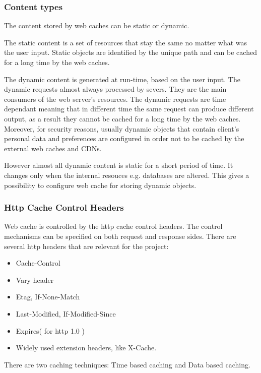 \subsubsection{Content types}


The content stored by web caches can be static or dynamic.

The static content is a set of resources that stay the same no matter what was the user input. Static objects are identified by the unique path and can be cached for a long time by the web caches.

The dynamic content is generated at run-time, based on the user input\cite{DynamicWebCaching}. The dynamic requests almost always processed by severs. They are the main consumers of the web server's resources. The dynamic requests are time dependant meaning that in different time the same request can produce different output, as a result they cannot be cached for a long time by the web caches. Moreover, for security reasons, usually dynamic objects that contain client's personal data and preferences are configured in order not to be cached by the external web caches and CDNs.

However almost all dynamic content is static for a short period of time. It changes only when the internal resouces e.g. databases are altered. This gives a possibility to configure web cache for storing dynamic objects.

\subsubsection{Http Cache Control Headers}

Web cache is controlled by the http cache control headers\cite{RFC7234}. The control mechanisms can be specified on both request and response sides. There are several http headers that are relevant for the project: 
\begin{itemize}
    \item Cache-Control
    \item Vary header
    \item Etag, If-None-Match
    \item Last-Modified, If-Modified-Since
    \item Expires( for http 1.0 )
    \item Widely used extension headers, like X-Cache.
\end{itemize}

There are two caching techniques: Time based caching and Data based caching.

